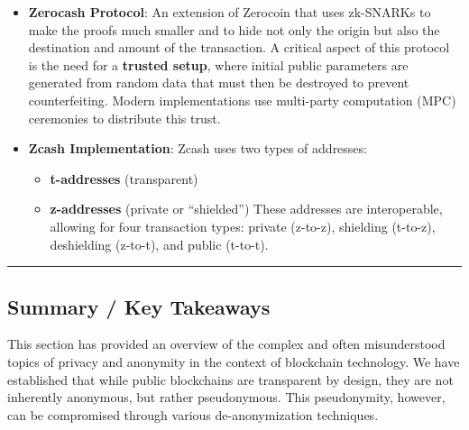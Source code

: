 \begin{itemize}
\tightlist
\item
  \textbf{Zerocash Protocol}: An extension of Zerocoin that uses
  zk-SNARKs to make the proofs much smaller and to hide not only the
  origin but also the destination and amount of the transaction. A
  critical aspect of this protocol is the need for a \textbf{trusted
  setup}, where initial public parameters are generated from random data
  that must then be destroyed to prevent counterfeiting. Modern
  implementations use multi-party computation (MPC) ceremonies to
  distribute this trust.
\end{itemize}


\begin{itemize}
\tightlist
\item
  \textbf{Zcash Implementation}: Zcash uses two types of addresses:

  \begin{itemize}
  \tightlist
  \item
    \textbf{t-addresses} (transparent)
  \item
    \textbf{z-addresses} (private or ``shielded'') These addresses are
    interoperable, allowing for four transaction types: private
    (z-to-z), shielding (t-to-z), deshielding (z-to-t), and public
    (t-to-t).
  \end{itemize}
\end{itemize}


\begin{center}\rule{0.5\linewidth}{0.5pt}\end{center}

\subsection{Summary / Key Takeaways}\label{summary-key-takeaways}

This section has provided an overview of the complex and
often misunderstood topics of privacy and anonymity in the context of
blockchain technology. We have established that while public blockchains
are transparent by design, they are not inherently anonymous, but rather
pseudonymous. This pseudonymity, however, can be compromised through
various de-anonymization techniques.

